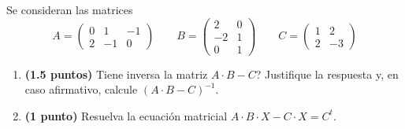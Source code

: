 
Se consideran las matrices
\[
  A=\begin{pmatrix}0&1&-1\\2&-1&0\end{pmatrix}
  \qquad B=\begin{pmatrix}2&0\\-2&1\\0&1\end{pmatrix}
  \qquad C=\begin{pmatrix}1&2\\2&-3\end{pmatrix}
\]
\begin{enumerate}[label=\alph*)]
  \item \textbf{(1.5 puntos)} \textquestiondown{}Tiene inversa la matriz
  $A\cdot B-C$? Justifique la respuesta y, en caso afirmativo, calcule
  $(A\cdot B-C)^{-1}$.
  \item \textbf{(1 punto)} Resuelva la ecuación matricial
  $A\cdot B\cdot X-C\cdot X=C^t$.
\end{enumerate}
